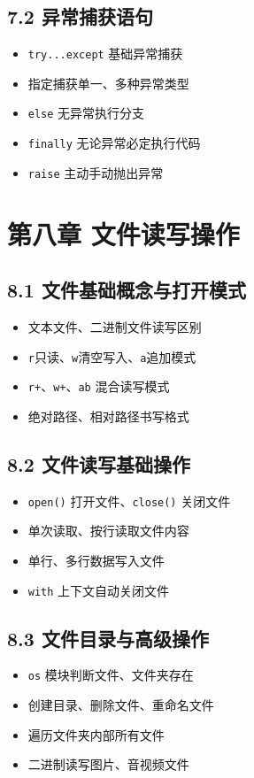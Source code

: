\subsection{7.2 异常捕获语句}
\begin{itemize}
\item \texttt{try...except} 基础异常捕获
\item 指定捕获单一、多种异常类型
\item \texttt{else} 无异常执行分支
\item \texttt{finally} 无论异常必定执行代码
\item \texttt{raise} 主动手动抛出异常
\end{itemize}

\section{第八章 文件读写操作}
\subsection{8.1 文件基础概念与打开模式}
\begin{itemize}
\item 文本文件、二进制文件读写区别
\item \texttt{r}只读、\texttt{w}清空写入、\texttt{a}追加模式
\item \texttt{r+}、\texttt{w+}、\texttt{ab} 混合读写模式
\item 绝对路径、相对路径书写格式
\end{itemize}

\subsection{8.2 文件读写基础操作}
\begin{itemize}
\item \texttt{open()} 打开文件、\texttt{close()} 关闭文件
\item 单次读取、按行读取文件内容
\item 单行、多行数据写入文件
\item \texttt{with} 上下文自动关闭文件
\end{itemize}

\subsection{8.3 文件目录与高级操作}
\begin{itemize}
\item \texttt{os} 模块判断文件、文件夹存在
\item 创建目录、删除文件、重命名文件
\item 遍历文件夹内部所有文件
\item 二进制读写图片、音视频文件
\end{itemize}

